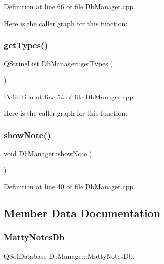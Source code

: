 Definition at line 66 of file Db\+Manager.\+cpp.

Here is the caller graph for this function\+:
\hypertarget{classDbManager_ade7585873652935bb12cb1ad546ceba2}{}\label{classDbManager_ade7585873652935bb12cb1ad546ceba2} 
\subsubsection{\texorpdfstring{get\+Types()}{getTypes()}}
{\footnotesize\ttfamily Q\+String\+List Db\+Manager\+::get\+Types (\begin{DoxyParamCaption}{ }\end{DoxyParamCaption})\hspace{0.3cm}{\ttfamily [static]}}



Definition at line 54 of file Db\+Manager.\+cpp.

Here is the caller graph for this function\+:
\hypertarget{classDbManager_a96908aac2c76d86fb1861ac8f755b962}{}\label{classDbManager_a96908aac2c76d86fb1861ac8f755b962} 
\subsubsection{\texorpdfstring{show\+Note()}{showNote()}}
{\footnotesize\ttfamily void Db\+Manager\+::show\+Note (\begin{DoxyParamCaption}{ }\end{DoxyParamCaption})\hspace{0.3cm}{\ttfamily [static]}}



Definition at line 40 of file Db\+Manager.\+cpp.



\subsection{Member Data Documentation}
\hypertarget{classDbManager_a3f6052f559a7a72eef66848ebc9f3eaa}{}\label{classDbManager_a3f6052f559a7a72eef66848ebc9f3eaa} 
\subsubsection{\texorpdfstring{Matty\+Notes\+Db}{MattyNotesDb}}
{\footnotesize\ttfamily Q\+Sql\+Database Db\+Manager\+::\+Matty\+Notes\+Db\hspace{0.3cm}{\ttfamily [static]}, {\ttfamily [private]}}



